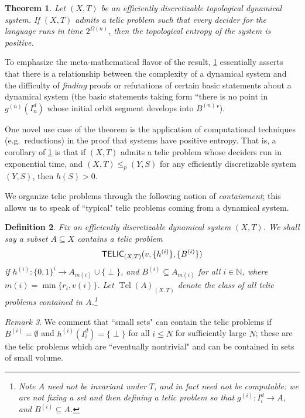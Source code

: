 \documentclass{amsart}
\theoremstyle{theorem}
\newtheorem{theorem}{Theorem}[section]
\newtheorem{definition}[theorem]{Definition}
\theoremstyle{remark}
\newtheorem{remark}[theorem]{Remark}
\numberwithin{equation}{section}
\DeclareMathOperator{\Tel}{Tel}
\newcommand{\NN}{\mathbb{N}}
\newcommand{\ccTELIC}{\textsf{\upshape TELIC}}
\begin{document}
\begin{theorem}\label{thm:entropyHardness}
Let $(X, T)$ be an efficiently discretizable topological dynamical system. If $(X, T)$ admits a telic problem such that every decider for the language runs in time $2^{\Omega(n)}$, then the topological entropy of the system is positive.
\end{theorem}

To emphasize the meta-mathematical flavor of the result, \cref{thm:entropyHardness} essentially asserts that there is a relationship between the complexity of a dynamical system and the difficulty of \emph{finding} proofs or refutations of certain basic statements about a dynamical system (the basic statements taking form ``there is no point in $g^{(n)}(I^d_n)$ whose initial orbit segment develops into $B^{(n)}$").

One novel use case of the theorem is the application of computational techniques (e.g.\ reductions) in the proof that systems have positive entropy. That is, a corollary of \cref{thm:entropyHardness} is that if $(X, T)$ admits a telic problem whose deciders run in exponential time, and $(X, T) \leq_p (Y, S)$ for any efficiently discretizable system $(Y, S)$, then $h(S)>0$.

We organize telic problems through the following notion of \emph{containment}; this allows us to speak of ``typical" telic problems coming from a dynamical system.

\begin{definition}\label{defContainment}
Fix an efficiently discretizable dynamical system $(X, T)$. We shall say a subset $A\subseteq X$ \emph{contains} a telic problem
\[\ccTELIC_{(X, T)}(v,\{h^{(i)}\},\{B^{(i)}\})\]
if $h^{(i)}:\{0,1\}^i \rightarrow A_{m(i)}\cup\{\perp\}$, and $B^{(i)} \subseteq A_{m(i)}$ for all $i \in \NN$, where $m(i) = \min\{r_i, v(i)\}$.
Let $\Tel(A)_{(X, T)}$ denote the class of all telic problems contained in $A$.\footnote{Note $A$ need not be invariant under $T$, and in fact need not be computable: we are not fixing a set \emph{and then} defining a telic problem so that $g^{(i)}:I_i^d \rightarrow A$, and $B^{(i)} \subseteq A$.}
\end{definition}

\begin{remark}
We comment that ``small sets" can contain the telic problems if $B^{(i)} = \emptyset$ and $h^{(i)}(I_i^d) = \{\perp\}$ for all $i \leq N$ for sufficiently large $N$; these are the telic problems which are ``eventually nontrivial" and can be contained in sets of small volume.
\end{remark}
\end{document}
